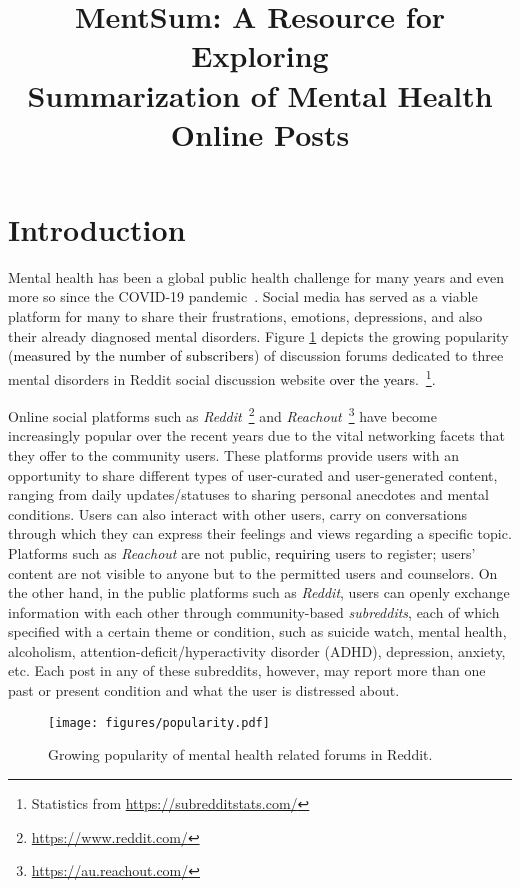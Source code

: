 \documentclass[10pt, a4paper]{article}
\title{ \textbf{MentSum: A Resource for Exploring \\Summarization of Mental Health Online Posts}}
\begin{document}
\maketitleabstract





\section{Introduction}

Mental health has been a global public health challenge for many years and even more so since the COVID-19 pandemic\textcolor{black}{~\cite{Holmes2020MultidisciplinaryRP,Pfefferbaum2020MentalHA,Otu2020MentalHA}.} Social media has served as a viable platform for many to share their frustrations, emotions, depressions, and also their already diagnosed mental disorders. Figure \ref{fig:popularity} depicts the growing popularity (\textcolor{black}{measured by the number of subscribers}) of discussion forums dedicated to three mental disorders in Reddit social discussion website \textcolor{black}{over the years}.~\footnote{Statistics  from \url{https://subredditstats.com/}}.







Online social platforms such as \textit{Reddit}~\footnote{\url{https://www.reddit.com/}} and \textit{Reachout}~\footnote{\url{https://au.reachout.com/}} have become increasingly popular over the recent years due to the vital networking facets that they offer to the community users. These platforms provide users with an opportunity to share different types of user-curated and user-generated content, ranging from daily updates/statuses to sharing personal anecdotes and mental conditions. Users can also interact with other users, carry on conversations through which they can express their feelings and views regarding a specific topic. Platforms such as \textit{Reachout} are not public, \textcolor{black}{requiring} users to register; users' content are not visible to anyone but to the permitted users and counselors. On the other hand, in the public platforms such as \textit{Reddit}, users can openly exchange information with each other through community-based \textit{subreddits}, each of which specified with a certain theme or condition, such as suicide watch, mental health, alcoholism, attention-deficit/hyperactivity disorder (ADHD), depression, anxiety, etc. Each post in any of these subreddits, however, {may report more than one past} or present condition and what the user is distressed about.  

\begin{figure}[t]
    \centering
    \texttt{[image: figures/popularity.pdf]}
    \caption{Growing popularity of mental health related forums in Reddit. }
    \label{fig:popularity}
\end{figure}
\end{document}
